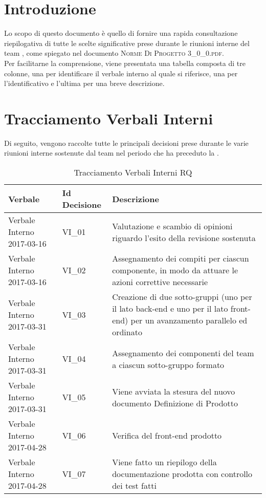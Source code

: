 \section{Introduzione}
Lo scopo di questo documento è quello di fornire una rapida consultazione riepilogativa di tutte le scelte significative prese durante le riunioni interne del team \gruppo, come spiegato nel documento \textsc{Norme Di Progetto 3\_0\_0.pdf}.\\
Per facilitarne la comprensione, viene presentata una tabella composta di tre colonne, una per identificare il verbale interno al quale si riferisce, una per l'identificativo e l'ultima per una breve descrizione.

\section{Tracciamento Verbali Interni}
Di seguito, vengono raccolte tutte le principali decisioni prese durante le varie riunioni interne sostenute dal team nel periodo che ha preceduto la \RQ.

\begin{table}[H]
	\begin{center}
		\begin{tabular}{|p{5.5cm} |p{2.5cm}| p{7cm}|}
			\hline
			\textbf{Verbale} & \textbf{Id Decisione}	& \textbf{Descrizione} \\
			\hline
			Verbale Interno 2017-03-16 & VI\_01	&  Valutazione e scambio di opinioni riguardo l'esito della revisione sostenuta \\
			\hline
			Verbale Interno 2017-03-16 & VI\_02 &  Assegnamento dei compiti per ciascun componente, in modo da attuare le azioni correttive necessarie \\
			\hline
			Verbale Interno 2017-03-31 & VI\_03	& Creazione di due sotto-gruppi (uno per il lato back-end e uno per il lato front-end) per un avanzamento parallelo ed ordinato	\\
			\hline
			Verbale Interno 2017-03-31 & VI\_04 & Assegnamento dei componenti del team a ciascun sotto-gruppo formato \\
			\hline
			Verbale Interno 2017-03-31 & VI\_05 & Viene avviata la stesura del nuovo documento Definizione di Prodotto \\
			\hline
			Verbale Interno 2017-04-28 & VI\_06	&  Verifica del front-end prodotto \\
			\hline
			Verbale Interno 2017-04-28 & VI\_07 &  Viene fatto un riepilogo della documentazione prodotta con controllo dei test fatti \\
			\hline
		\end{tabular}
		\caption{Tracciamento Verbali Interni RQ}
	\end{center}
\end{table}